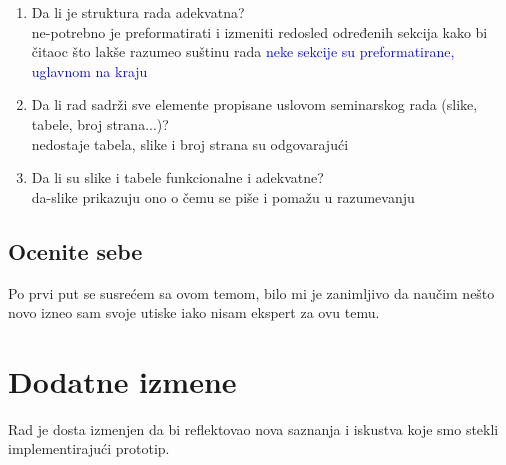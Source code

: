 \documentclass[a4paper]{report}
\newcommand{\odgovor}[1]{\textcolor{blue}{#1}}
\begin{document}
\begin{enumerate}
\item Da li je struktura rada adekvatna?\\
ne-potrebno je preformatirati i izmeniti redosled određenih sekcija kako bi čitaoc što lakše razumeo suštinu rada
\odgovor{
neke sekcije su preformatirane, uglavnom na kraju
}

\item Da li rad sadrži sve elemente propisane uslovom seminarskog rada (slike, tabele, broj strana...)?\\
nedostaje tabela, slike i broj strana su odgovarajući

\item Da li su slike i tabele funkcionalne i adekvatne?\\
da-slike prikazuju ono o čemu se piše i pomažu u razumevanju

\end{enumerate}

\section{Ocenite sebe}
Po prvi put se susrećem sa ovom temom, bilo mi je zanimljivo da naučim nešto novo izneo sam svoje utiske iako nisam ekspert za ovu temu.


\chapter{Dodatne izmene}

Rad je dosta izmenjen da bi reflektovao nova saznanja i iskustva koje smo stekli implementirajući prototip.
\end{document}
